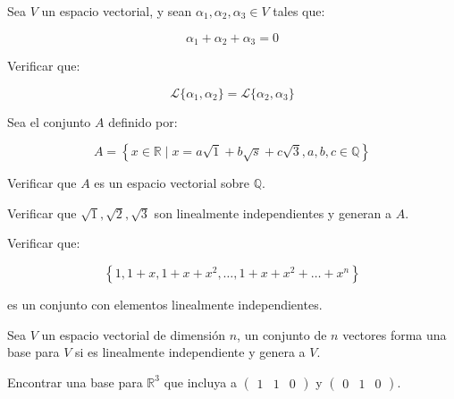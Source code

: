 		\begin{ejercicio}
			Sea $V$ un espacio vectorial, y sean $\alpha_1, \alpha_2, \alpha_3 \in V$ tales que:

			\begin{equation*}
				\alpha_1 + \alpha_2 + \alpha_3 = 0
			\end{equation*}

			Verificar que:

			\begin{equation*}
				\mathcal{L}\{ \alpha_1, \alpha_2 \} = \mathcal{L}\{ \alpha_2, \alpha_3 \}
			\end{equation*}
		\end{ejercicio}

		\begin{ejercicio}
			Sea el conjunto $A$ definido por:

			\begin{equation*}
				A = \left\{ x \in \mathbb{R} \mid x = a \sqrt{1} + b \sqrt{s} + c \sqrt{3}, a, b, c \in \mathbb{Q} \right\}
			\end{equation*}

			Verificar que $A$ es un espacio vectorial sobre $\mathbb{Q}$.

			Verificar que $\sqrt{1}, \sqrt{2}, \sqrt{3}$ son linealmente independientes y generan a $A$.
		\end{ejercicio}

		\begin{ejercicio}
			Verificar que:

			\begin{equation*}
				\left\{ 1, 1 + x, 1 + x + x^2, \dots, 1 + x + x^2 + \dots + x^n \right\}
			\end{equation*}

			es un conjunto con elementos linealmente independientes.
		\end{ejercicio}

		\begin{definicion}
			Sea $V$ un espacio vectorial de dimensión $n$, un conjunto de $n$ vectores forma una base para $V$ si es linealmente independiente y genera a $V$.
		\end{definicion}

		\begin{ejercicio}
			Encontrar una base para $\mathbb{R}^3$ que incluya a $\begin{pmatrix} 1 & 1 & 0 \end{pmatrix}$ y $\begin{pmatrix} 0 & 1 & 0 \end{pmatrix}$.
		\end{ejercicio}

